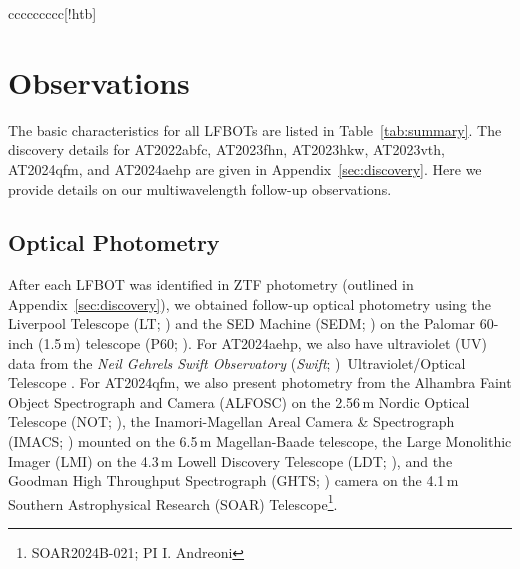 \documentclass[twocolumn,twocolappendix, linenumbers, trackchanges]{aastex7}
\newcommand{\swift}{\emph{Swift}}
\begin{document}
\begin{deluxetable*}{ccccccccc}[!htb]
\enddata
\vspace{2.5mm}   
\end{deluxetable*}

\section{Observations} \label{sec:methods}

The basic characteristics for all LFBOTs are listed in Table~\ref{tab:summary}.  The discovery details for AT2022abfc, AT2023fhn, AT2023hkw, AT2023vth, AT2024qfm, and AT2024aehp are given in Appendix~\ref{sec:discovery}. Here we provide details on our multiwavelength follow-up observations. 

\subsection{Optical Photometry}
\label{sec:optical-photometry}

After each LFBOT was identified in ZTF photometry (outlined in Appendix~\ref{sec:discovery}), we obtained follow-up optical photometry 
using the Liverpool Telescope (LT; \citealt{lt}) and the SED Machine (SEDM; \citealt{sedm1, sedm2, sedm3}) on the Palomar 60-inch (1.5\,m) telescope (P60; \citealt{p60}). For AT2024aehp, we also have ultraviolet (UV) data from the {\it Neil Gehrels Swift Observatory} (\swift; \citealt{Gehrels2004})$\,$ Ultraviolet/Optical Telescope \citep{swift_uvot}.  
For AT2024qfm, we also present photometry from the Alhambra Faint Object Spectrograph and Camera (ALFOSC) on the 2.56\,m Nordic Optical Telescope (NOT; \citealt{not}), the Inamori-Magellan Areal Camera \& Spectrograph (IMACS; \citealt{imacs}) mounted on the 6.5\,m Magellan-Baade telescope, the Large Monolithic Imager (LMI) on the 4.3\,m Lowell Discovery Telescope (LDT; \citealt{ldt}), and the Goodman High Throughput Spectrograph (GHTS; \citealt{ghts}) camera on the 4.1\,m Southern Astrophysical Research (SOAR) Telescope\footnote{SOAR2024B-021; PI I. Andreoni}. %
\end{document}
